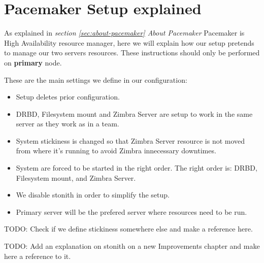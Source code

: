 
\section {Pacemaker Setup explained}
As explained in \textit{section \ref{sec:about-pacemaker} About Pacemaker} Pacemaker is High Availability resource manager, here we will explain how our setup pretends to manage our two servers resources. These instructions should only be performed on \textbf{primary} node.

These are the main settings we define in our configuration:
\begin{itemize}
  \item Setup deletes prior configuration.
  \item DRBD, Filesystem mount and Zimbra Server are setup to work in the same server as they work as in a team.
  \item System stickiness is changed so that Zimbra Server resource is not moved from where it's running to avoid Zimbra innecessary downtimes.
  \item System are forced to be started in the right order. The right order is: DRBD, Filesystem mount, and Zimbra Server.
  \item We disable stonith in order to simplify the setup.
  \item Primary server will be the prefered server where resources need to be run.
\end{itemize}

TODO: Check if we define stickiness somewhere else and make a reference here.

TODO: Add an explanation on stonith on a new Improvements chapter and make here a reference to it.


